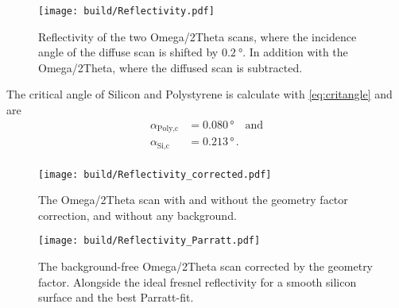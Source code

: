 \begin{figure}[H]
    \centering
    \texttt{[image: build/Reflectivity.pdf]}
    \caption{Reflectivity of the two Omega/2Theta scans, where the incidence angle of the diffuse scan is shifted by $\SI{0.2}{\degree}$. In addition with the Omega/2Theta, where the diffused scan is subtracted.} 
    \label{fig:Omega2Theta1}
\end{figure}


The critical angle of Silicon and Polystyrene is calculate with \autoref{eq:critangle} and are
\begin{align*}
    \alpha_{\text{Poly}, \text{c}}  &=    0.080 \, \unit{\degree}   \quad \text{and} \\
    \alpha_{\text{Si}, \text{c}}    &=     0.213\, \unit{\degree} \,.    \\
\end{align*}



\begin{figure}[H]
    \centering
    \texttt{[image: build/Reflectivity\_corrected.pdf]}
    \caption{The Omega/2Theta scan with and without the geometry factor correction, and without any background.} 
    \label{fig:Omega2Theta1_2}
\end{figure}



\begin{figure}[H]
    \centering
    \texttt{[image: build/Reflectivity\_Parratt.pdf]}
    \caption{The background-free Omega/2Theta scan corrected by the geometry factor. Alongside the ideal fresnel reflectivity for a smooth silicon surface and the best Parratt-fit.} 
    \label{fig:Omega2Theta2}
\end{figure}
